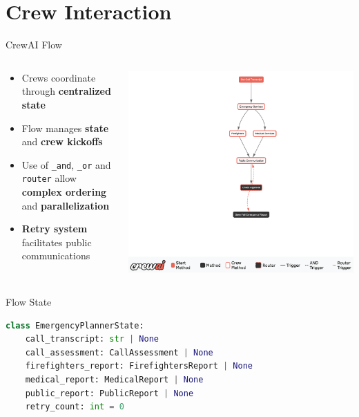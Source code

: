 \section{Crew Interaction}
\begin{frame}{CrewAI Flow}
    \begin{columns}
        \begin{column}{0.45\textwidth}
            \begin{itemize}
                \item Crews coordinate through \textbf{centralized state}
                \item Flow manages \textbf{state} and \textbf{crew kickoffs}
                \item Use of \texttt{\_and}, \texttt{\_or} and \texttt{router} allow \textbf{complex ordering} and \textbf{parallelization}
                \item \textbf{Retry system} facilitates public communications
            \end{itemize}
        \end{column}
        \begin{column}{0.55\textwidth}
            \includegraphics[width=\textwidth]{../figures/coordination_flow.png}
        \end{column}
    \end{columns}
\end{frame}

\begin{frame}[fragile]{Flow State}
    \begin{lstlisting}[language=Python]
class EmergencyPlannerState:
    call_transcript: str | None
    call_assessment: CallAssessment | None
    firefighters_report: FirefightersReport | None
    medical_report: MedicalReport | None
    public_report: PublicReport | None
    retry_count: int = 0
    \end{lstlisting}
\end{frame}